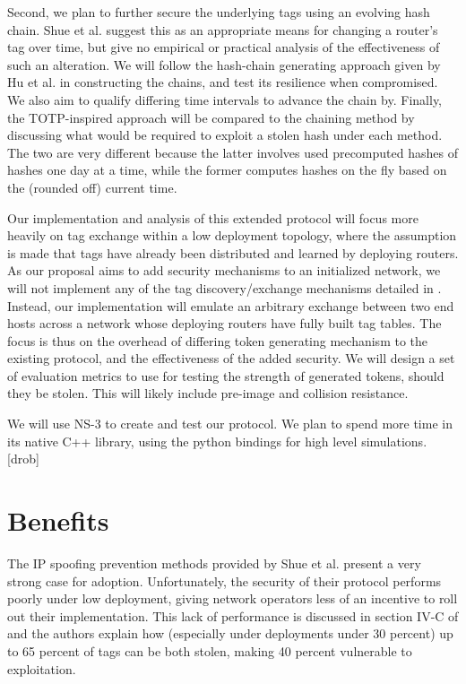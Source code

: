 \documentclass[12pt]{article} %
\begin{document}
	Second, we plan to further secure the underlying tags using an evolving hash chain. Shue et al. suggest this as an appropriate means for changing a router's tag over time, but give no empirical or practical analysis of the effectiveness of such an alteration. We will follow the hash-chain generating approach given by Hu et al. \cite{Hu} in constructing the chains, and test its resilience when compromised. We also aim to qualify differing time intervals to advance the chain by. Finally, the TOTP-inspired approach will be compared to the chaining method by discussing what would be required to exploit a stolen hash under each method. The two are very different because the latter involves used precomputed hashes of hashes one day at a time, while the former computes hashes on the fly based on the (rounded off) current time.

	Our implementation and analysis of this extended protocol will focus more heavily on tag exchange within a low deployment topology, where the assumption is made that tags have already been distributed and learned by deploying routers. As our proposal aims to add security mechanisms to an initialized network, we will not implement any of the tag discovery/exchange mechanisms detailed in \cite{Shue20081567}. Instead, our implementation will emulate an arbitrary exchange between two end hosts across a network whose deploying routers have fully built tag tables. The focus is thus on the overhead of differing token generating mechanism to the existing protocol, and the effectiveness of the added security. We will design a set of evaluation metrics to use for testing the strength of generated tokens, should they be stolen. This will likely include pre-image and collision resistance.

	We will use NS-3 to create and test our protocol. We plan to spend more time in its native C++ library, using the python bindings for high level simulations. [drob]

\section{Benefits}

	The IP spoofing prevention methods provided by Shue et al. present a very strong case for adoption. Unfortunately, the security of their protocol performs poorly under low deployment, giving network operators less of an incentive to roll out their implementation. This lack of performance is discussed in section IV-C of \cite{Shue20081567} and the authors explain how (especially under deployments under 30 percent) up to 65 percent of tags can be both stolen, making 40 percent vulnerable to exploitation.
\end{document}
